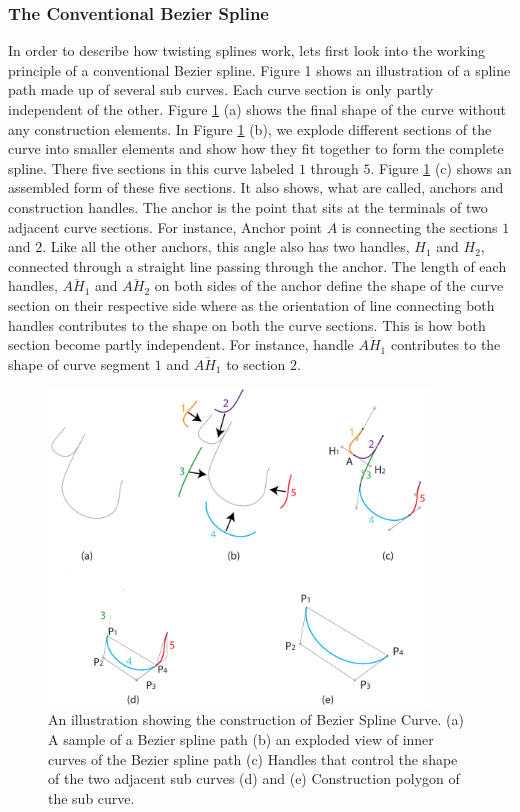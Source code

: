     \subsubsection{The Conventional Bezier Spline}
        In order to describe how twisting splines work, lets first look into the working principle of a conventional Bezier spline. Figure 1 shows an illustration of a spline path made up of several sub curves. Each curve section is only partly independent of the other. Figure \ref{Fig:RotatingBezierSplines}  (a) shows the final shape of the curve without any construction elements. In Figure \ref{Fig:RotatingBezierSplines} (b), we explode different sections of the curve into smaller elements and show how they fit together to form the complete spline. There five sections in this curve labeled $1$ through $5$. Figure \ref{Fig:RotatingBezierSplines} (c) shows an assembled form of these five sections. It also shows, what are called, anchors and construction handles. The anchor is the point that sits at the terminals of two adjacent curve sections. For instance, Anchor point $A$  is connecting the sections $1$ and $2$. Like all the other anchors, this angle also has two handles, $H_1$ and $H_2$, connected through a straight line passing through the anchor. The length of each handles, $\overline{AH_1}$  and $\overline{AH_2}$ on both sides of the anchor define the shape of the curve section on their respective side where as the orientation of line connecting both handles contributes to the shape on both the curve sections. This is how both section become partly independent. For instance, handle $\overline{AH_1}$ contributes to the shape of curve segment $1$ and $\overline{AH_1}$ to section $2$.


        \begin{figure}
          \centering
          \includegraphics[width=0.9\textwidth]{BezierSplineCurve.pdf}
          \caption{An illustration showing the construction of Bezier Spline Curve. (a) A sample of a Bezier spline path (b) an exploded view of inner curves of the Bezier spline path (c) Handles that control the shape of the two adjacent sub curves (d) and (e) Construction polygon of the sub curve.
          } \label{Fig:RotatingBezierSplines}
        \end{figure}

